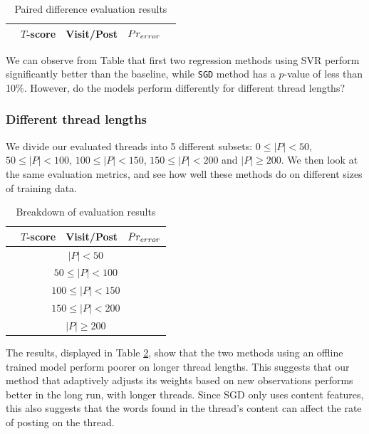 \begin{table}
	\footnotesize
\begin{center}
\begin{tabular}{| l | c | c | c | l |}
\hline
& $T$-score			   &	Visit/Post & 	$Pr_{error}$ &\\
\hline
	
\hline
\end{tabular}
\end{center}
\caption{Paired difference evaluation results}\label{tbl:diff_eval}
\end{table}

We can observe from Table \label{tbl:diff_eval} that first two regression 
methods using SVR perform significantly better than the baseline, while 
\texttt{SGD} method has a $p$-value of less than 10\%. However, do the models 
perform differently for different thread lengths?

\subsubsection{Different thread lengths}
We divide our evaluated threads into 5 different subsets: $0 \leq |P| < 50$,
$50 \leq |P| < 100$, $100 \leq |P| < 150$, $150 \leq |P| < 200$ and $|P| \geq 
200$. We then look at the same evaluation metrics, and see how well these 
methods do on different sizes of training data.

\begin{table}
	\footnotesize
\begin{center}
\begin{tabular}{| l | c | c | c|}
\hline
& $T$-score			   &	Visit/Post & 	$Pr_{error}$ \\
\hline
	\multicolumn{4}{|c|}{$|P| < 50$}\\
\hline
	
\hline
	\multicolumn{4}{|c|}{$50 \leq |P| < 100$}\\
\hline
	
\hline
	\multicolumn{4}{|c|}{$100 \leq |P| < 150$}\\
\hline
	
\hline
	\multicolumn{4}{|c|}{$150 \leq |P| < 200$}\\
\hline
	
\hline
	\multicolumn{4}{|c|}{$|P| \geq 200$}\\
\hline
	
\hline
\end{tabular}
\end{center}
\caption{Breakdown of evaluation results}\label{tbl:bin_eval}
\end{table}
The results, displayed in Table \ref{tbl:bin_eval}, show that the two methods 
using an offline trained model perform poorer on longer thread lengths. This 
suggests that our method that adaptively adjusts its weights based on new 
observations performs better in the long run, with longer threads. Since SGD 
only uses content features, this also suggests that the words found in the 
thread's content can affect the rate of posting on the thread.

